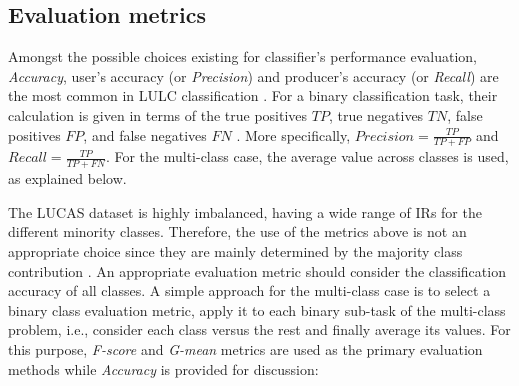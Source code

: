 \documentclass[remotesensing,article,submit,moreauthors,pdftex]{Definitions/mdpi}
\begin{document}
\subsection{Evaluation metrics}  \label{Evaluation metrics}

Amongst the possible choices existing for classifier's performance evaluation,
\textit{Accuracy}, user's accuracy (or \textit{Precision}) and
producer's accuracy (or \textit{Recall}) are the most common in LULC
classification \cite{Liu2007, Olofsson2013}. For a binary classification task,
their calculation is given in terms of the true positives \( TP \), true
negatives \(TN \), false positives \( FP \), and false negatives \( FN \)
\cite{Liu2007}. More specifically,  \( \textit{Precision} =  \frac{TP}{TP + FP}
\) and \(\textit{Recall} =  \frac{TP}{TP + FN} \). For the multi-class case, the
average value across classes is used, as explained below.

The LUCAS dataset is highly imbalanced, having a wide range of IRs for the
different minority classes. Therefore, the use of the metrics above is not an
appropriate choice since they are mainly determined by the majority class
contribution \cite{He2009}. An appropriate evaluation metric should consider the
classification accuracy of all classes. A simple approach for the multi-class
case is to select a binary class evaluation metric, apply it to each binary
sub-task of the multi-class problem, i.e., consider each class versus the rest
and finally average its values. For this purpose, \textit{F-score} and
\textit{G-mean} metrics are used as the primary evaluation methods while
\textit{Accuracy} is provided for discussion:
\end{document}
